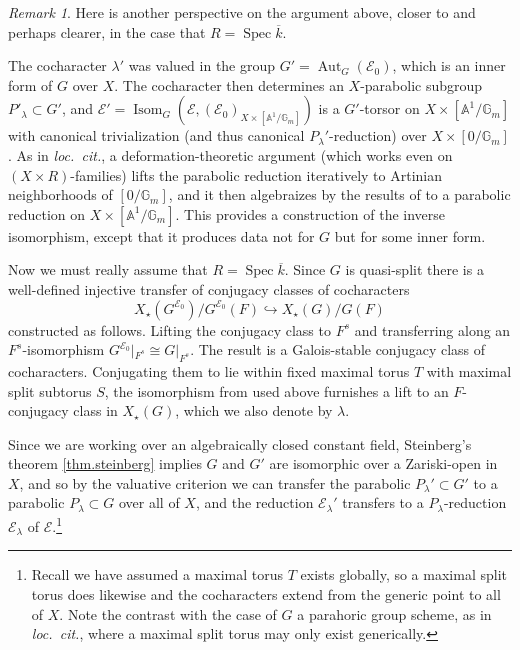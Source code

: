\documentclass[openany]{amsbook}
\theoremstyle{definition}
\theoremstyle{remark}
\newtheorem{remark}[theorem]{Remark}
\numberwithin{equation}{section}
\newcommand{\G}{\mathbb{G}}
\newcommand{\cE}{\mathcal{E}}
\newcommand{\A}{\mathbb{A}}
\newcommand{\ol}[1]{\overline{#1}}
\renewcommand{\-}{\operatorname{-}}
\newcommand{\Spec}{\operatorname{Spec}}
\newcommand{\Aut}{\operatorname{Aut}}
\newcommand{\on}[1]{\operatorname{#1}}
\renewcommand{\A}{\mathbb{A}}
\begin{document}
\begin{remark}
    Here is another perspective on the argument above, closer to \cite{HeinlothGIT} and perhaps clearer, in the case that $R = \Spec \ol{k}$. 
    
    The cocharacter $\lambda'$ was valued in the group $G' = \Aut_G(\cE_0)$, which is an inner form of $G$ over $X$. The cocharacter then determines an $X$-parabolic subgroup $P'_{\lambda} \subset G'$, and $\cE' = \on{Isom}_G(\cE, (\cE_0)_{X \times [\A^1/\G_m]})$ is a $G'$-torsor on $X \times [\A^1/\G_m]$ with canonical trivialization (and thus canonical $P_{\lambda}'$-reduction) over $X \times [0/\G_m]$. As in \textit{loc.\ cit.}, a deformation-theoretic argument (which works even on $(X \times R)$-families) lifts the parabolic reduction iteratively to Artinian neighborhoods of $[0/\G_m]$, and it then algebraizes by the results of \cite{equivalgebraiz} to a parabolic reduction on $X \times [\A^1/\G_m]$. This provides a construction of the inverse isomorphism, except that it produces data not for $G$ but for some inner form.
    
    Now we must really assume that $R = \Spec \ol{k}$. Since $G$ is quasi-split there is a well-defined injective transfer of conjugacy classes of cocharacters
$$
    X_\star(G^{\cE_0})/G^{\cE_0}(F) \hookrightarrow X_\star(G)/G(F)
$$
constructed as follows. Lifting the conjugacy class to $F^s$ and transferring along an $F^s$-isomorphism $G^{\cE_0}|_{F^s} \cong G|_{F^s}$. The result is a Galois-stable conjugacy class of cocharacters. Conjugating them to lie within fixed maximal torus $T$ with maximal split subtorus $S$, the isomorphism from \cite[Lemma 1.1.3]{KottwitzTransfer} used above furnishes a lift to an $F$-conjugacy class in $X_\star(G)$, which we also denote by $\lambda$.

Since we are working over an algebraically closed constant field, Steinberg's theorem \ref{thm.steinberg} implies $G$ and $G'$ are isomorphic over a Zariski-open in $X$, and so by the valuative criterion we can transfer the parabolic $P_\lambda' \subset G'$ to a parabolic $P_\lambda \subset G$ over all of $X$, and the reduction $\cE_\lambda'$ transfers to a $P_\lambda$-reduction $\cE_\lambda$ of $\cE$.\footnote{Recall we have assumed a maximal torus $T$ exists globally, so a maximal split torus does likewise and the cocharacters extend from the generic point to all of $X$. Note the contrast with the case of $G$ a parahoric group scheme, as in \textit{loc.\ cit.}, where a maximal split torus may only exist generically.}
\end{remark}
\end{document}
